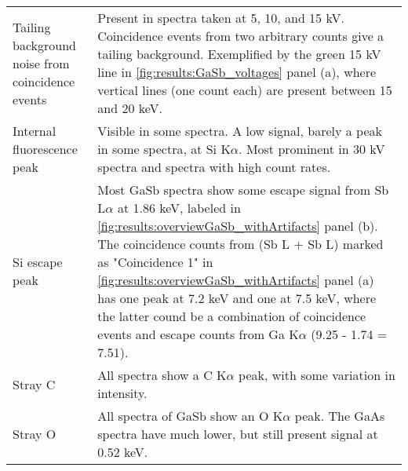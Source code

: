 \begin{table}[phtb]
\begin{center}
\begin{tabular}{p{3.5cm}p{11.1cm}}
			Tailing background noise from coincidence events & Present in spectra taken at 5, 10, and 15 kV. Coincidence events from two arbitrary counts give a tailing background. Exemplified by the green 15 kV line in \cref{fig:results:GaSb_voltages} panel (a), where vertical lines (one count each) are present between 15 and 20 keV.                                                                                                                                                               \\
			Internal fluorescence peak                       & Visible in some spectra. A low signal, barely a peak in some spectra, at Si K$\alpha$. Most prominent in 30 kV spectra and spectra with high count rates.                                                                                                                                                                                                                                                                                       \\
			Si escape peak                                   & Most GaSb spectra show some escape signal from Sb L$\alpha$ at 1.86 keV, labeled in \cref{fig:results:overviewGaSb_withArtifacts} panel (b). The coincidence counts from (Sb L + Sb L) marked as "Coincidence 1" in \cref{fig:results:overviewGaSb_withArtifacts} panel (a) has one peak at 7.2 keV and one at 7.5 keV, where the latter cound be a combination of coincidence events and escape counts from Ga K$\alpha$ (9.25 - 1.74 = 7.51). \\
			Stray C                                          & All spectra show a C K$\alpha$ peak, with some variation in intensity.                                                                                                                                                                                                                                                                                                                                                                          \\
			Stray O                                          & All spectra of GaSb show an O K$\alpha$ peak. The GaAs spectra have much lower, but still present signal at 0.52 keV.                                                                                                                                                                                                                                                                                                                           \\
			\hline
		\end{tabular}
	\end{center}
\end{table}
